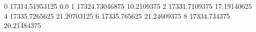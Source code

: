 0 17314.51953125 0.0
1 17324.73046875 10.2109375
2 17331.7109375 17.19140625
4 17335.7265625 21.20703125
6 17335.765625 21.24609375
8 17334.734375 20.21484375
